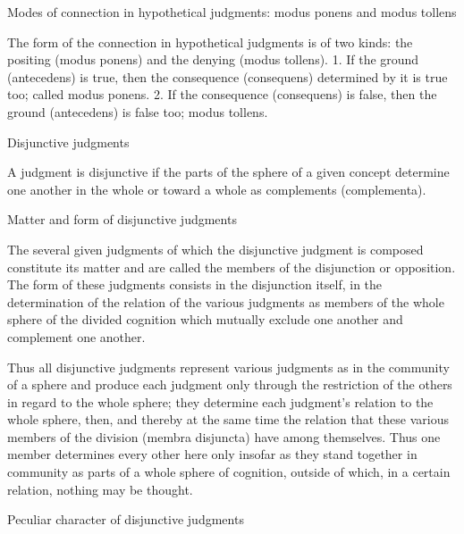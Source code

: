 Modes of connection in hypothetical judgments: modus ponens and modus tollens

The form of the connection in hypothetical judgments is of two kinds:
the positing (modus ponens) and the denying (modus tollens).
1. If the ground (antecedens) is true, then
the consequence (consequens) determined by it is true too;
called modus ponens.
2. If the consequence (consequens) is false, then
the ground (antecedens) is false too;
modus tollens.

Disjunctive judgments

A judgment is disjunctive if the parts of the sphere of a given concept
determine one another in the whole or toward a whole as complements
(complementa).

Matter and form of disjunctive judgments

The several given judgments of which the disjunctive judgment is composed
constitute its matter and are called the members of the disjunction or opposition.
The form of these judgments consists in the disjunction itself,
in the determination of the relation of the various judgments as
members of the whole sphere of the divided cognition which mutually
exclude one another and complement one another.

    Thus all disjunctive judgments represent various judgments as
    in the community of a sphere and produce each judgment only through
    the restriction of the others in regard to the whole sphere;
    they determine each judgment's relation to the whole sphere, then, and
    thereby at the same time the relation that these various members of
    the division (membra disjuncta) have among themselves.
    Thus one member determines every other here only
    insofar as they stand together in community as parts of a whole sphere of
    cognition, outside of which, in a certain relation, nothing may be thought.

Peculiar character of disjunctive judgments

